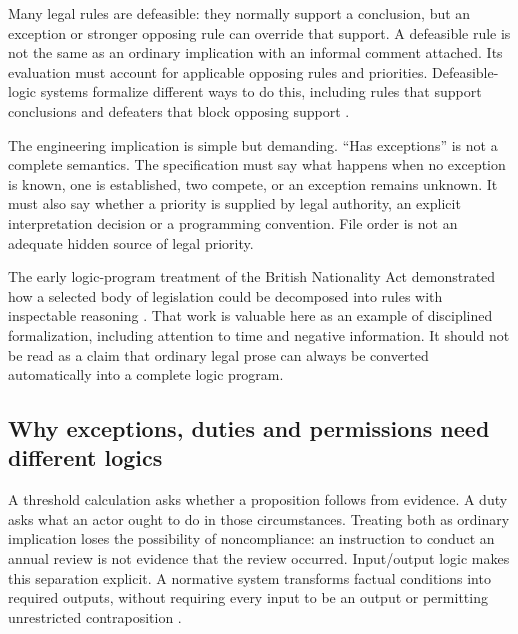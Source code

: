 \documentclass[12pt,a4paper,oneside,openany]{book}
\begin{document}
Many legal rules are defeasible: they normally support a conclusion, but an
exception or stronger opposing rule can override that support. A defeasible
rule is not the same as an ordinary implication with an informal comment
attached. Its evaluation must account for applicable opposing rules and
priorities. Defeasible-logic systems formalize different ways to do this,
including rules that support conclusions and defeaters that block opposing
support \citep[sec.~2]{defeasible2000}.

The engineering implication is simple but demanding. ``Has exceptions'' is
not a complete semantics. The specification must say what happens when no
exception is known, one is established, two compete, or an exception remains
unknown. It must also say whether a priority is supplied by legal authority,
an explicit interpretation decision or a programming convention. File order
is not an adequate hidden source of legal priority.

The early logic-program treatment of the British Nationality Act demonstrated
how a selected body of legislation could be decomposed into rules with
inspectable reasoning \citep{sergot1986}. That work is valuable here as an
example of disciplined formalization, including attention to time and negative
information. It should not be read as a claim that ordinary legal prose can
always be converted automatically into a complete logic program.

\subsection{Why exceptions, duties and permissions need different logics}
\label{merge:P-02a-foundations:00}


A threshold calculation asks whether a proposition follows from evidence. A duty
asks what an actor ought to do in those circumstances. Treating both as ordinary
implication loses the possibility of noncompliance: an instruction to conduct an
annual review is not evidence that the review occurred. Input/output logic makes
this separation explicit. A normative system transforms factual conditions into
required outputs, without requiring every input to be an output or permitting
unrestricted contraposition \citep[secs.~2--3]{inputoutput2000}.
\end{document}
